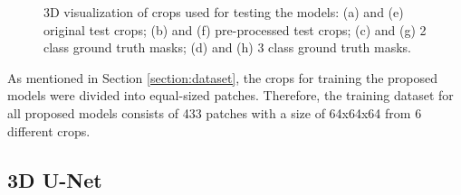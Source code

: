 \begin{figure}[!htb]
\hfil 
{}\hfil
{}\hfil
{}
\caption{3D visualization of crops used for testing the models: (a) and (e) original test crops; (b) and (f) pre-processed test crops; (c) and (g) 2 class ground truth masks; (d) and (h) 3 class ground truth masks.}

\label{fig:dataset}

\end{figure}

As mentioned in Section \ref{section:dataset}, the crops for training the proposed models were divided into equal-sized patches. Therefore, the training dataset for all proposed models consists of 433 patches with a size of 64x64x64 from 6 different crops.

\subsection{3D U-Net}

